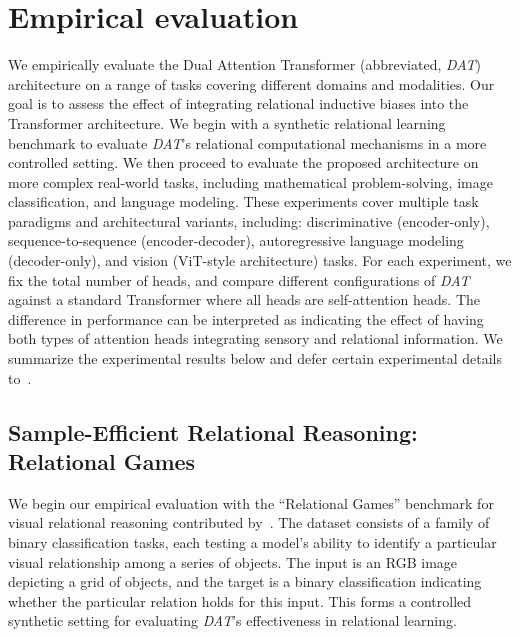 \section{Empirical evaluation}\label{sec:experiments}

We empirically evaluate the Dual Attention Transformer (abbreviated, \textit{DAT}) architecture on a range of tasks covering different domains and modalities. Our goal is to assess the effect of integrating relational inductive biases into the Transformer architecture. We begin with a synthetic relational learning benchmark to evaluate \textit{DAT}'s relational computational mechanisms in a more controlled setting. We then proceed to evaluate the proposed architecture on more complex real-world tasks, including mathematical problem-solving, image classification, and language modeling. These experiments cover multiple task paradigms and architectural variants, including: discriminative (encoder-only), sequence-to-sequence (encoder-decoder), autoregressive language modeling (decoder-only), and vision (ViT-style architecture) tasks.
For each experiment, we fix the total number of heads, and compare different configurations of \textit{DAT} against a standard Transformer where all heads are self-attention heads. The difference in performance can be interpreted as indicating the effect of having both types of attention heads integrating sensory and relational information.
We summarize the experimental results below and defer certain experimental details to~.

\subsection{Sample-Efficient Relational Reasoning: Relational Games}\label{ssec:relgames}

We begin our empirical evaluation with the ``Relational Games'' benchmark for visual relational reasoning contributed by~\citet{shanahanExplicitlyRelationalNeurala}. The dataset consists of a family of binary classification tasks, each testing a model's ability to identify a particular visual relationship among a series of objects. The input is an RGB image depicting a grid of objects, and the target is a binary classification indicating whether the particular relation holds for this input. This forms a controlled synthetic setting for evaluating \textit{DAT}'s effectiveness in relational learning.

